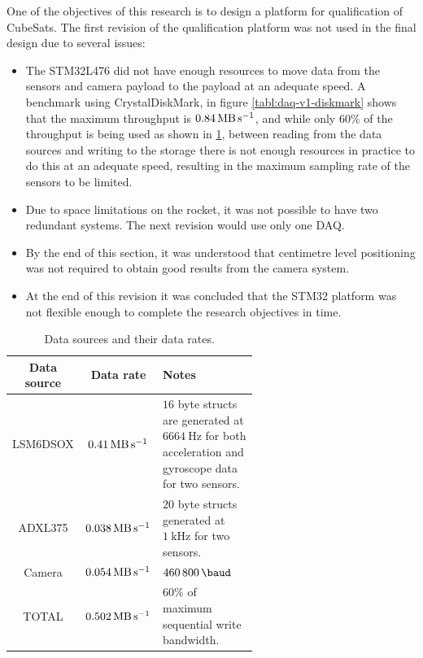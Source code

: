 \documentclass[a4paper,11pt]{article}
\begin{document}
One of the objectives of this research is to design a platform for qualification of CubeSats. The first revision of the qualification platform was not used in the final design due to several issues:

\begin{itemize}
  \item The STM32L476 did not have enough resources to move data from the sensors and camera payload to the payload at an adequate speed. A benchmark using CrystalDiskMark, in figure \ref{tabl:daq-v1-diskmark} shows that the maximum throughput is $\SI{0.84}{\mega\byte\per\second}$, and while only 60\% of the throughput is being used as shown in \ref{tabl:daq-v1-sensor-datarate}, between reading from the data sources and writing to the storage there is not enough resources in practice to do this at an adequate speed, resulting in the maximum sampling rate of the sensors to be limited.
  \item Due to space limitations on the rocket, it was not possible to have two redundant systems. The next revision would use only one DAQ.
  \item By the end of this section, it was understood that centimetre level positioning was not required to obtain good results from the camera system.
  \item At the end of this revision it was concluded that the STM32 platform was not flexible enough to complete the research objectives in time.
\end{itemize}

\begin{table}[H]
\centering
\label{tabl:daq-v1-sensor-datarate}
\begin{tabular}{|c|c|p{0.6\linewidth}|}
  Data source & Data rate  & Notes \\ 
  \hline
  LSM6DSOX & $\SI{0.41}{\mega\byte\per\second}$ & $16$ byte structs are generated at $\SI{6664}{\hertz}$ for both acceleration and gyroscope data for two sensors.\\
  ADXL375  & $\SI{0.038}{\mega\byte\per\second}$ & $20$ byte structs generated at $\SI{1}{\kilo\hertz}$ for two sensors.\\
  Camera  & $\SI{0.054}{\mega\byte\per\second}$ & $\SI{460800}{\baud}$ \\
  TOTAL   & $\SI{0.502}{\mega\byte\per\second}$ & $60\%$ of maximum sequential write bandwidth.
\end{tabular}
\caption{Data sources and their data rates.}
\end{table}
\end{document}
